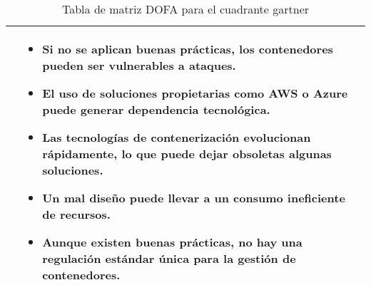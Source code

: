 \begin{table}[H]
\begin{tabularx}{\textwidth}{|X|X|}
\hspace{4mm} %
&
\begin{minipage}[t]{\dimexpr\linewidth-8mm} %
\vspace{2pt}
\begin{itemize}
    \setlength\itemsep{0pt}
    \setlength\parskip{0pt}
    \setlength\parsep{0pt}
    \item \hspace{5mm} Si no se aplican buenas prácticas, los contenedores pueden ser vulnerables a ataques.
    \item \hspace{5mm} El uso de soluciones propietarias como AWS o Azure puede generar dependencia tecnológica.
    \item \hspace{5mm} Las tecnologías de contenerización evolucionan rápidamente, lo que puede dejar obsoletas algunas soluciones.
    \item \hspace{5mm} Un mal diseño puede llevar a un consumo ineficiente de recursos.
    \item \hspace{5mm} Aunque existen buenas prácticas, no hay una regulación estándar única para la gestión de contenedores.
\end{itemize}
\vspace{2pt}
\end{minipage}
\hspace{4mm} %
\\
\hline
\end{tabularx}
\caption{Tabla de matriz DOFA para el cuadrante gartner}
\label{tab:matriz-dofa}
\end{table}